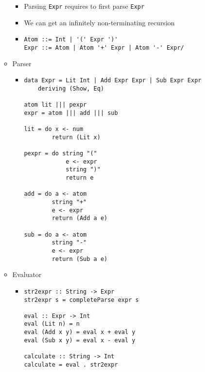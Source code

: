 \begin{itemize}
\begin{itemize}
\begin{itemize}
                    \item Parsing \verb+Expr+ requires to first parse \verb+Expr+
                    \item We can get an infinitely non-terminating recursion
                    \item
\begin{verbatim}
Atom ::= Int | '(' Expr ')'
Expr ::= Atom | Atom '+' Expr | Atom '-' Expr/
\end{verbatim}
                \end{itemize}
            \item Parser
                \begin{itemize}
                    \item
\begin{verbatim}
data Expr = Lit Int | Add Expr Expr | Sub Expr Expr
    deriving (Show, Eq)

atom lit ||| pexpr
expr = atom ||| add ||| sub

lit = do x <- num
        return (Lit x)

pexpr = do string "("
            e <- expr
            string ")"
            return e

add = do a <- atom
        string "+"
        e <- expr
        return (Add a e)

sub = do a <- atom
        string "-"
        e <- expr
        return (Sub a e)
\end{verbatim}
                \end{itemize}
            \item Evaluator
                \begin{itemize}
                    \item
\begin{verbatim}
str2expr :: String -> Expr
str2expr s = completeParse expr s

eval :: Expr -> Int
eval (Lit n) = n
eval (Add x y) = eval x + eval y
eval (Sub x y) = eval x - eval y

calculate :: String -> Int
calculate = eval . str2expr
\end{verbatim}
                \end{itemize}
        \end{itemize}
\end{itemize}
